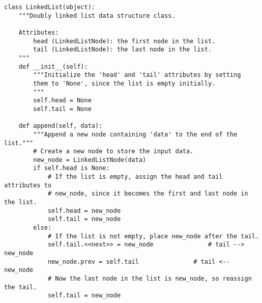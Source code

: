 \begin{lstlisting}
class LinkedList(object):
    """Doubly linked list data structure class.

    Attributes:
        head (LinkedListNode): the first node in the list.
        tail (LinkedListNode): the last node in the list.
    """
    def __init__(self):
        """Initialize the 'head' and 'tail' attributes by setting
        them to 'None', since the list is empty initially.
        """
        self.head = None
        self.tail = None

    def append(self, data):
        """Append a new node containing 'data' to the end of the list."""
        # Create a new node to store the input data.
        new_node = LinkedListNode(data)
        if self.head is None:
            # If the list is empty, assign the head and tail attributes to
            # new_node, since it becomes the first and last node in the list.
            self.head = new_node
            self.tail = new_node
        else:
            # If the list is not empty, place new_node after the tail.
            self.tail.<<next>> = new_node               # tail --> new_node
            new_node.prev = self.tail               # tail <-- new_node
            # Now the last node in the list is new_node, so reassign the tail.
            self.tail = new_node
\end{lstlisting}

